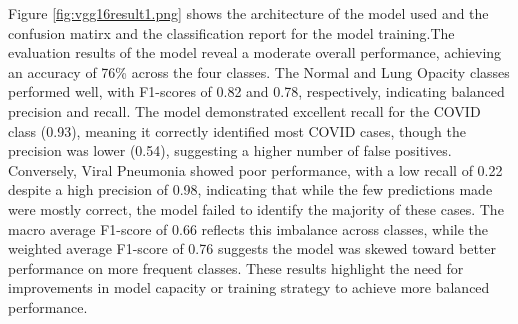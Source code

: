 \documentclass{article}
\begin{document}
Figure \ref{fig:vgg16result1.png} shows the architecture of the model used and the confusion matirx and the classification report for the model training.The evaluation results of the model reveal a moderate overall performance, achieving an accuracy of 76\% across the four classes. The Normal and Lung Opacity classes performed well, with F1-scores of 0.82 and 0.78, respectively, indicating balanced precision and recall. The model demonstrated excellent recall for the COVID class (0.93), meaning it correctly identified most COVID cases, though the precision was lower (0.54), suggesting a higher number of false positives. Conversely, Viral Pneumonia showed poor performance, with a low recall of 0.22 despite a high precision of 0.98, indicating that while the few predictions made were mostly correct, the model failed to identify the majority of these cases. The macro average F1-score of 0.66 reflects this imbalance across classes, while the weighted average F1-score of 0.76 suggests the model was skewed toward better performance on more frequent classes. These results highlight the need for improvements in model capacity or training strategy to achieve more balanced performance.
\end{document}
